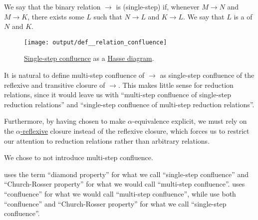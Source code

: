 \begin{definition}\label{def:relation_confluence}\mimprovised
  We say that the binary relation \( {\to} \) is (single-step)  if, whenever \( M \to N \) and \( M \to K \), there exists some \( L \) such that \( N \to L \) and \( K \to L \). We say that \( L \) is a  of \( N \) and \( K \).

  \begin{figure}[!ht]
    \centering
    \texttt{[image: output/def\_\_relation\_confluence]}
    \caption{\hyperref[def:relation_confluence]{Single-step confluence} as a \hyperref[def:hasse_diagram]{Hasse diagram}.}\label{fig:def:relation_confluence}
  \end{figure}
\end{definition}
\begin{comments}
  \item It is natural to define multi-step confluence of \( {\to} \) as single-step confluence of the reflexive and transitive closure of \( {\to} \). This makes little sense for reduction relations, since it would leave us with \enquote{multi-step confluence of single-step reduction relations} and \enquote{single-step confluence of multi-step reduction relations}.

  Furthermore, by having chosen to make \( \alpha \)-equivalence explicit, we must rely on the \hyperref[def:alpha_reflexive_closure]{\( \alpha \)-reflexive} closure instead of the reflexive closure, which forces us to restrict our attention to reduction relations rather than arbitrary relations.

  We chose to not introduce multi-step confluence.

  \item {} uses the term \enquote{diamond property} for what we call \enquote{single-step confluence} and \enquote{Church-Rosser property} for what we would call \enquote{multi-step confluence}.  uses \enquote{confluence} for what we would call \enquote{multi-step confluence}, while  use both \enquote{confluence} and \enquote{Church-Rosser property} for what we call \enquote{single-step confluence}.
\end{comments}

